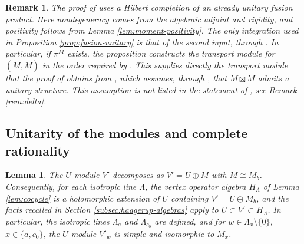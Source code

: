 \documentclass[leqno]{article}
\newcommand{\ovl}{\overline}
\newtheorem{lemma}[thm]{Lemma}
\newtheorem{remark}[thm]{Remark}
\numberwithin{equation}{section}
\begin{document}
\begin{remark}\normalfont
\label{rem:krein}
The proof of \cite[Proposition 3.16 p.~36]{Ten24} uses a Hilbert completion of an already unitary fusion product. Here nondegeneracy comes from the algebraic adjoint and rigidity, and positivity follows from Lemma \ref{lem:moment-positivity}. The only integration used in Proposition \ref{prop:fusion-unitary} is that of the second input, through \cite[Proposition 4.2]{Ten24}. In particular, if $\pi^M$ exists, the proposition constructs the transport module for $(\ovl M,M)$ in the order required by \cite[Theorem 4.19 p.~55]{Ten24}. This supplies directly the transport module that the proof of \cite[Theorem 4.20 p.~55]{Ten24} obtains from \cite[Corollary 4.5 p.~44]{Ten24}, which assumes, through \cite[Theorem 4.4 p.~44]{Ten24}, that $\ovl M\boxtimes M$ admits a unitary structure. This assumption is not listed in the statement of \cite[Theorem 4.20]{Ten24}, see Remark \ref{rem:delta}.
\end{remark}

\subsection{Unitarity of the modules and complete rationality}
\label{subsec:rationality-U}

\begin{lemma}
\label{lem:V-decomposition}
The $U$-module $V'$ decomposes as $V' = U \oplus M$ with $M \cong M_b$. Consequently, for each isotropic line $\Lambda$, the vertex operator algebra $H_\Lambda$ of Lemma \ref{lem:cocycle} is a holomorphic extension of $U$ containing $V' = U \oplus M_b$, and the facts recalled in Section \ref{subsec:haagerup-algebras} apply to $U \subset V' \subset H_\Lambda$. In particular, the isotropic lines $\Lambda_a$ and $\Lambda_{c_0}$ are defined, and for $w \in \Lambda_x \setminus \{0\}$, $x \in \{a,c_0\}$, the $U$-module $V'_w$ is simple and isomorphic to $M_x$.
\end{lemma}
\end{document}
